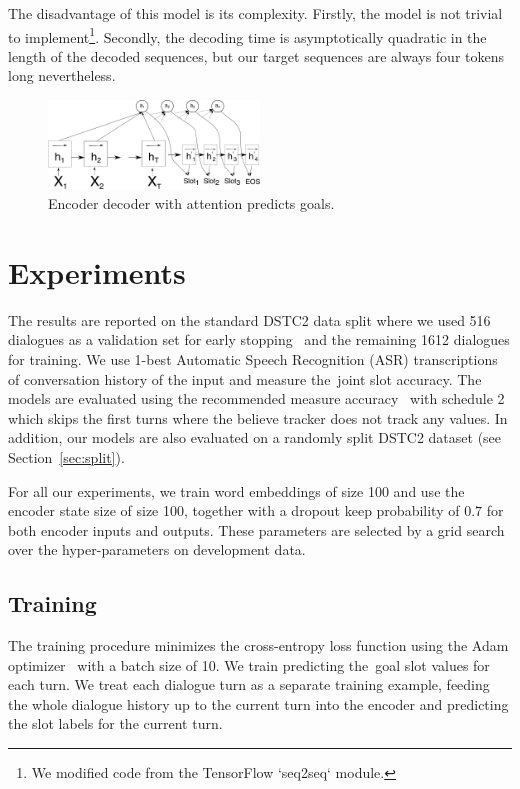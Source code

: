 \documentclass{itatnew}
\begin{document}
The disadvantage of this model is its complexity.
Firstly, the model is not trivial to implement\footnote{We modified code from the TensorFlow `seq2seq` module.}. 
Secondly, the decoding time is asymptotically quadratic in the length of the decoded sequences, but our target sequences are always four tokens long nevertheless.
\begin{figure}
\includegraphics[width=0.5\textwidth]{encdec}
\caption{Encoder decoder with attention predicts goals.}
\label{fig:encdec}
\end{figure}

\section{Experiments}\label{sec:exp}
The results are reported on the standard DSTC2 data split where we used 516 dialogues as a validation set for early stopping~\cite{prechelt1998early} and the remaining 1612 dialogues for training.
We use 1-best Automatic Speech Recognition (ASR) transcriptions of conversation history of the input and measure the~joint slot accuracy.
The models are evaluated using the recommended measure accuracy~\cite{henderson2014second} with schedule 2 which skips the first turns where the believe tracker does not track any values. 
In addition, our models are also evaluated on a randomly split DSTC2 dataset (see Section~\ref{sec:split}).

For all our experiments, we train word embeddings of size 100 and use the encoder state size of size 100, together with a dropout keep probability of $0.7$ for both encoder inputs and outputs.
These parameters are selected by a grid search over the hyper-parameters on development data.

\subsection{Training}
\label{sec:train}
The training procedure minimizes the cross-entropy loss function using the Adam optimizer~\cite{kingma2014adam} with a batch size of 10.
We train predicting the~goal slot values for each turn.
We treat each dialogue turn as a separate training example, feeding the whole dialogue history up to the current turn into the encoder and predicting the slot labels for the current turn.
\end{document}
